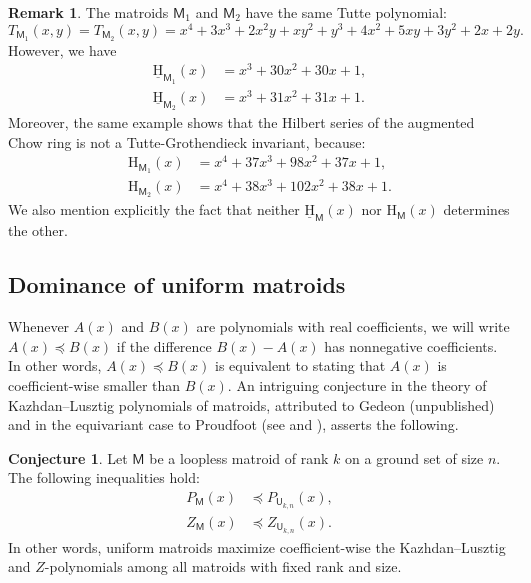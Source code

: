 \documentclass[11pt, a4paper, english]{amsart}
\theoremstyle{teoremas}
\theoremstyle{definition}
\newtheorem{conjecture}[theorem]{Conjecture}
\newtheorem{remark}[theorem]{Remark}
\newcommand{\M}{\mathsf{M}}
\newcommand{\U}{\mathsf{U}}
\renewcommand{\H}{\mathrm{H}}
\newcommand{\uH}{\underline{\mathrm{H}}}
\begin{document}
\begin{remark}
The matroids $\M_1$ and $\M_2$ have the same Tutte polynomial:
    \[ T_{\M_1}(x,y) = T_{\M_2}(x,y) = x^{4} + 3 x^{3} + 2 x^{2} y + x y^{2} + y^{3} + 4 x^{2} + 5 x y + 3 y^{2} + 2 x + 2 y.\]
However, we have
    \begin{align*} 
        \uH_{\M_1}(x) &= x^3 + 30x^2 + 30x + 1,\\
        \uH_{\M_2}(x) &= x^3 + 31x^2 + 31x + 1.
    \end{align*}
Moreover, the same example shows that the Hilbert series of the augmented Chow ring is not a Tutte-Grothendieck invariant, because:
    \begin{align*} 
        \H_{\M_1}(x) &= x^4 + 37x^3 + 98x^2 + 37x + 1,\\
        \H_{\M_2}(x) &= x^4 + 38x^3 + 102x^2 + 38x + 1.
    \end{align*}
We also mention explicitly the fact that neither $\uH_{\M}(x)$ nor $\H_{\M}(x)$ determines the other.
\end{remark}



\subsection{Dominance of uniform matroids}\label{subsec:dominance-uniform}

Whenever $A(x)$ and $B(x)$ are polynomials with real coefficients, we will write $A(x) \preceq B(x)$ if the difference $B(x) - A(x)$ has nonnegative coefficients. In other words, $A(x)\preceq B(x)$ is equivalent to stating that $A(x)$ is coefficient-wise smaller than $B(x)$. An intriguing conjecture in the theory of Kazhdan--Lusztig polynomials of matroids, attributed to Gedeon (unpublished) and in the equivariant case to Proudfoot (see \cite[Conjecture~1.1]{lee-nasr-radcliffe} and \cite[Conjecture~1.6]{karn-proudfoot-nasr-vecchi}), asserts the following.

\begin{conjecture}
    Let $\M$ be a loopless matroid of rank $k$ on a ground set of size $n$. The following inequalities hold:
    \begin{align*}
        P_{\M}(x) &\preceq P_{\U_{k,n}}(x),\\
        Z_{\M}(x) &\preceq Z_{\U_{k,n}}(x).
    \end{align*}
    In other words, uniform matroids maximize coefficient-wise the Kazhdan--Lusztig and $Z$-polynomials among all matroids with fixed rank and size.
\end{conjecture}
\end{document}
